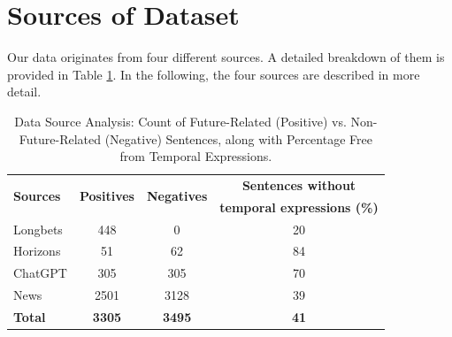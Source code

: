 \documentclass[12pt,oneside,bibtotoc,liststotoc]{scrbook}
\begin{document}
\section{Sources of Dataset}
Our data originates from four different sources. A detailed breakdown of them is provided in Table \ref{tab:dataset}. In the following, the four sources are described in more detail.

\begin{table}[h]
  \centering
  \begin{tabular}{lccc}
    \toprule
    \multirow{2}{*}{\textbf{Sources}} & \multirow{2}{*}{\textbf{Positives}} & \multirow{2}{*}{\textbf{Negatives}} & \textbf{Sentences without} \\
    & & & \textbf{temporal expressions (\%)} \\
    \midrule
    Longbets & 448 & 0 & 20 \\
    Horizons & 51 & 62 & 84 \\
    ChatGPT & 305 & 305 & 70 \\
    News & 2501 & 3128 & 39 \\
    \bottomrule
    \textbf{Total} & \textbf{3305} & \textbf{3495} & \textbf{41} \\
  \bottomrule
  \end{tabular}
  \caption{Data Source Analysis: Count of Future-Related (Positive) vs. Non-Future-Related (Negative) Sentences, along with Percentage Free from Temporal Expressions.}
  \label{tab:dataset}
\end{table}
\end{document}
